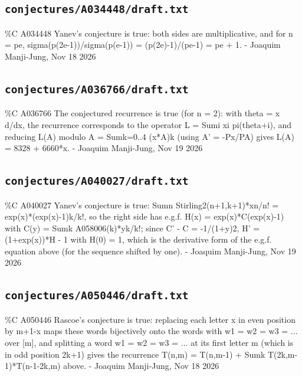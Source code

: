 \subsection*{\texttt{conjectures/A034448/draft.txt}}
{\small\raggedright\ttfamily
\%C A034448 Yanev's conjecture is true: both sides are multiplicative, and for n = pe, sigma(p(2e-1))/sigma(p(e-1)) = (p(2e)-1)/(pe-1) = pe + 1. - Joaquim Manji-Jung, Nov 18 2026\par
}
\subsection*{\texttt{conjectures/A036766/draft.txt}}
{\small\raggedright\ttfamily
\%C A036766 The conjectured recurrence is true (for n = 2): with theta = x d/dx, the recurrence corresponds to the operator L = Sumi xi pi(theta+i), and reducing L(A) modulo A = Sumk=0..4 (x*A)k (using A' = -Px/PA) gives L(A) = 8328 + 6660*x. - Joaquim Manji-Jung, Nov 19 2026\par
}
\subsection*{\texttt{conjectures/A040027/draft.txt}}
{\small\raggedright\ttfamily
\%C A040027 Yanev's conjecture is true: Sumn Stirling2(n+1,k+1)*xn/n! = exp(x)*(exp(x)-1)k/k!, so the right side has e.g.f. H(x) = exp(x)*C(exp(x)-1) with C(y) = Sumk A058006(k)*yk/k!; since C' - C = -1/(1+y)2, H' = (1+exp(x))*H - 1 with H(0) = 1, which is the derivative form of the e.g.f. equation above (for the sequence shifted by one). - Joaquim Manji-Jung, Nov 19 2026\par
}
\subsection*{\texttt{conjectures/A050446/draft.txt}}
{\small\raggedright\ttfamily
\%C A050446 Rascoe's conjecture is true: replacing each letter x in even position by m+1-x maps these words bijectively onto the words with w1 = w2 = w3 = ... over [m], and splitting a word w1 = w2 = w3 = ... at its first letter m (which is in odd position 2k+1) gives the recurrence T(n,m) = T(n,m-1) + Sumk T(2k,m-1)*T(n-1-2k,m) above. - Joaquim Manji-Jung, Nov 18 2026\par
}
